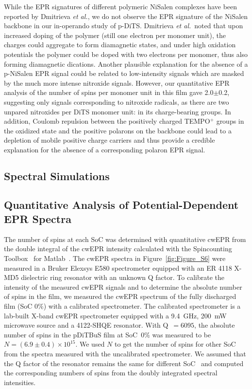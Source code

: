 \par
While the EPR signatures of different polymeric NiSalen complexes have been reported by Dmitrieva \textit{et al.},\cite{Dmitrieva2018} we do not observe the EPR signature of the NiSalen backbone in our in-operando study of p-DiTS. Dmitrieva \textit{et al.}\ noted that upon increased doping of the polymer (still one electron per monomer unit), the charges could aggregate to form diamagnetic states, and under high oxidation potentials the polymer could be doped with two electrons per monomer, thus also forming diamagnetic dications. Another plausible explanation for the absence of a p-NiSalen EPR signal could be related to low-intensity signals which are masked by the much more intense nitroxide signals. However, our quantitative EPR analysis of the number of spins per monomer unit in this film gave 2.0$\pm$0.2, suggesting only signals corresponding to nitroxide radicals, as there are two unpared nitroxides per DiTS monomer unit: in its charge-bearing groups.
In addition, Coulomb repulsion between the positively charged TEMPO$^+$ groups in the oxidized state and the positive polarons on the backbone could lead to a depletion of mobile positive charge carriers and thus provide a credible explanation for the absence of a corresponding polaron EPR signal.
%


\subsection{Spectral Simulations}

\subsection{Quantitative Analysis of Potential-Dependent EPR Spectra}
\label{sec:quantitative_EPR}


The number of spins at each SoC was determined with quantitative cwEPR from the double integral of the cwEPR intensity calculated with the Spincounting Toolbox~\cite{spin_counting_tb} for Matlab~\cite{SI:Matlab}. The cwEPR spectra in Figure~\ref{fig:Figure_S6} were measured in a Bruker Elexsys E580 spectrometer equipped with an ER 4118 X-MD5 dielectric ring resonator with an unknown Q factor. To calibrate the intensity of the measured cwEPR signals and to determine the absolute number of spins in the film, we measured the cwEPR spectrum of the fully discharged film (SoC 0\%) with a calibrated spectrometer. The calibrated spectrometer is a lab-built X-band cwEPR spectrometer equipped with a 9.4~GHz, 200~mW microwave source and a 4122-SHQE resonator. With Q~$=6095$, the absolute number of spins in the pDiTBuS film at SoC~0\% was measured to be $N=(6.9\pm0.4)\times10^{15}$. We used $N$ to get the number of spins for other SoC from the spectra measured with the uncalibrated spectrometer. We assumed that the Q factor of the resonator remains the same for different SoC~\cite{Kulikov2022_SI} and computed the corresponding numbers of spins from the doubly integrated spectral intensities.\\

